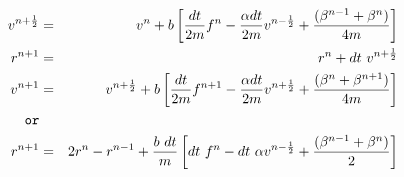 \documentclass[24pt]{article}
\newcommand{\myhalf}{\frac{1}{2}}
\begin{document}
\begin{eqnarray*}
v^{n+\myhalf}  &=& v^n + b \left [ \frac{dt}{2m} f^n -  \frac{\alpha dt}{2m} v^{n-\myhalf} + \frac{(\beta^{n-1}+\beta^n)}{4m} \right ] \\
r^{n+1}  &=& r^n + dt~v^{n+\myhalf}  \\
v^{n+1}  &=& v^{n+\myhalf} + b \left [ \frac{dt}{2m} f^{n+1} - \frac{\alpha dt}{2m} v^{n+\myhalf} + \frac{(\beta^n+\beta^{n+1})}{4m} \right ] \\
{\tt or} \\
r^{n+1}  &=& 2r^n - r^{n-1} + \frac{b~dt}{m} \left [ dt~f^n -  dt~\alpha v^{n-\myhalf} +  \frac{(\beta^{n-1}+\beta^n)}{2} \right ] \\
\end{eqnarray*}
\end{document}
